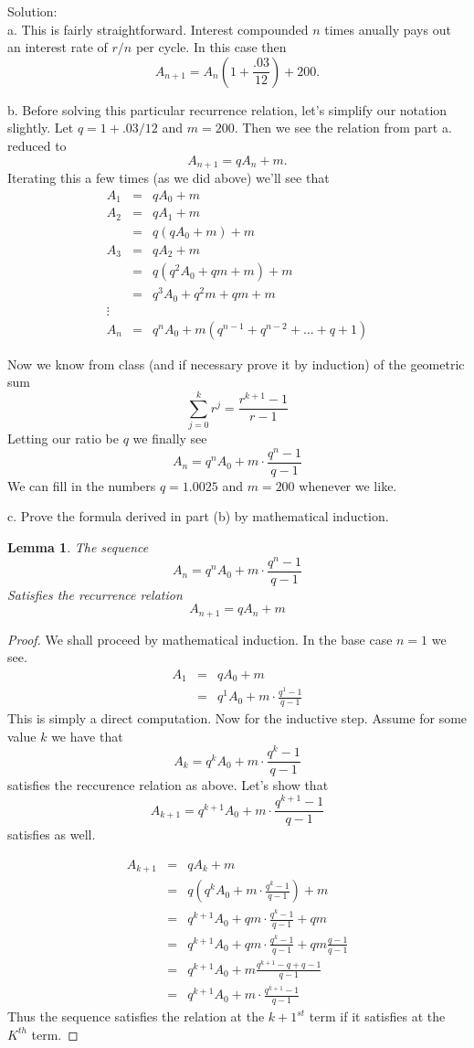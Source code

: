 \documentclass[10 pt]{amsart}
\newtheorem{lem}[thm]{Lemma}
\theoremstyle{definition}
\theoremstyle{remark}
\numberwithin{equation}{subsection}
\begin{document}
Solution:\\
a. This is fairly straightforward.  Interest compounded $n$ times anually pays out an interest rate of $r/n$ per cycle.  In this case then
\[
A_{n+1} = A_n (1+\frac{.03}{12}) + 200.
\]


b. Before solving this particular recurrence relation, let's simplify our notation slightly.  Let $q=1+.03/12$ and $m=200$.
Then we see the relation from part a. reduced to 
\[
A_{n+1}=qA_n + m.
\]
Iterating this a few times (as we did above) we'll see that
\begin{eqnarray*}
A_1 &=& qA_0 + m\\
A_2 &=& qA_1+m\\
&=& q(qA_0+m)+m\\
A_3 &=& qA_2+m \\
&=& q(q^2A_0 + qm +m)+m\\
&=& q^3A_0 + q^2m+qm+m\\
\vdots &&\\
A_n &=& q^nA_0 + m(q^{n-1}+q^{n-2}+\dots+q+1)
\end{eqnarray*}


Now we know from class (and if necessary prove it by induction) of the geometric sum
\[
\sum_{j=0}^{k}r^j = \frac{r^{k+1}-1}{r-1}
\]
Letting our ratio be $q$ we finally see
\[
A_n = q^nA_0 + m\cdot\frac{q^n-1}{q-1}
\]
We can fill in the numbers $q=1.0025$ and $m=200$ whenever we like.

c. Prove the formula derived in part (b) by mathematical induction.
\begin{lem}
The sequence
\[
A_n = q^nA_0 + m\cdot\frac{q^n-1}{q-1}
\]
Satisfies the recurrence relation
\[
A_{n+1} = qA_n +m
\]
\end{lem}
\begin{proof}
We shall proceed by mathematical induction.  In the base case $n=1$ we see. 
\begin{eqnarray*}
A_1 &=& qA_0+m\\
&=& q^1A_0 + m\cdot\frac{q^1-1}{q-1}
\end{eqnarray*}
This is simply a direct computation.
Now for the inductive step.
Assume for some value $k$ we have that
\[
A_k =q^kA_0 + m\cdot\frac{q^k-1}{q-1}
\]
satisfies the reccurence relation as above.  Let's show that
\[
A_{k+1} =q^{k+1}A_0 + m\cdot\frac{q^{k+1}-1}{q-1}
\]
satisfies as well.

\begin{eqnarray*}
A_{k+1} &=& qA_k+m \\
&=& q(q^kA_0 + m\cdot\frac{q^k-1}{q-1})+m\\
&=& q^{k+1} A_0 + qm\cdot\frac{q^k-1}{q-1}+qm\\
&=&q^{k+1} A_0 + qm\cdot\frac{q^k-1}{q-1}+qm\frac{q-1}{q-1}\\
&=&q^{k+1}A_0 + m\frac{q^{k+1}-q+q-1}{q-1}\\
&=& q^{k+1}A_0 + m\cdot\frac{q^{k+1}-1}{q-1}
\end{eqnarray*}
Thus the sequence satisfies the relation at the $k+1^{st}$ term if it satisfies at the $K^{th}$ term.
\end{proof}
\end{document}
